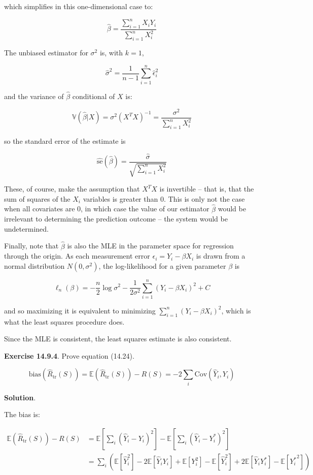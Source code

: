 which simplifies in this one-dimensional case to:

\[\hat{\beta} = \frac{\sum_{i=1}^n X_i Y_i}{\sum_{i=1}^n X_i^2}\]

The unbiased estimator for \(\sigma^2\) is, with \(k = 1\),

\[\hat{\sigma}^2 = \frac{1}{n - 1} \sum_{i=1}^n \hat{\epsilon}_i^2\]

and the variance of \(\hat{\beta}\) conditional of \(X\) is:

\[\mathbb{V}(\hat{\beta} | X) = \sigma^2 (X^T X)^{-1} = \frac{\sigma^2}{\sum_{i=1}^n X_i^2}\]

so the standard error of the estimate is

\[\hat{\text{se}}(\hat{\beta}) = \frac{\hat{\sigma}}{\sqrt{\sum_{i=1}^n X_i^2}}\]

These, of course, make the assumption that \(X^T X\) is invertible --
that is, that the sum of squares of the \(X_i\) variables is greater
than 0. This is only not the case when all covariates are 0, in which
case the value of our estimator \(\hat{\beta}\) would be irrelevant to
determining the prediction outcome -- the system would be undetermined.

Finally, note that \(\hat{\beta}\) is also the MLE in the parameter
space for regression through the origin. As each measurement error
\(\epsilon_i = Y_i - \beta X_i\) is drawn from a normal distribution
\(N(0, \sigma^2)\), the log-likelihood for a given parameter \(\beta\)
is

\[\ell_n(\beta) = -\frac{n}{2} \log \sigma^2 - \frac{1}{2 \sigma^2} \sum_{i=1}^n (Y_i - \beta X_i)^2 + C\]

and so maximizing it is equivalent to minimizing
\(\sum_{i=1}^n (Y_i - \beta X_i)^2\), which is what the least squares
procedure does.

Since the MLE is consistent, the least squares estimate is also
consistent.

\textbf{Exercise 14.9.4}. Prove equation (14.24).

\[ \text{bias}(\hat{R}_\text{tr}(S)) = \mathbb{E}(\hat{R}_\text{tr}(S)) - R(S) = -2 \sum_i \text{Cov}(\hat{Y}_i, Y_i) \]

\textbf{Solution}.

The bias is:

\begin{align}
\mathbb{E}(\hat{R}_\text{tr}(S)) - R(S) &= \mathbb{E}\left[\sum_i (\hat{Y}_i- Y_i)^2 \right] - \mathbb{E} \left[ \sum_i (\hat{Y}_i - Y_i^*)^2 \right] \\
&= \sum_i \left( \mathbb{E} \left[\hat{Y}_i^2 \right] - 2 \mathbb{E} \left[\hat{Y}_i Y_i \right] + \mathbb{E}\left[Y_i^2 \right] - \mathbb{E} \left[\hat{Y}_i^2 \right] + 2 \mathbb{E} \left[\hat{Y}_i Y_i^* \right] - \mathbb{E}\left[{Y_i^*}^2 \right] \right)
\end{align}

